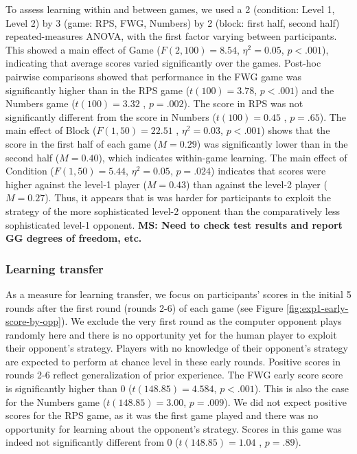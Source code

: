 \documentclass[
  english,
  man,floatsintext]{apa6}
\begin{document}
To assess learning within and between games, we used a 2 (condition: Level 1, Level 2) by 3 (game: RPS, FWG, Numbers) by 2 (block: first half, second half) repeated-measures ANOVA, with the first factor varying between participants. This showed a main effect of Game (\(F(2,100) = 8.54\), \(\eta^{2} = 0.05\), \(p < .001\)), indicating that average scores varied significantly over the games. Post-hoc pairwise comparisons showed that performance in the FWG game was significantly higher than in the RPS game (\(t(100) =3.78\), \(p < .001\)) and the Numbers game (\(t(100) = 3.32\) , \(p = .002\)). The score in RPS was not significantly different from the score in Numbers (\(t(100) = 0.45\) , \(p = .65\)). The main effect of Block (\(F(1,50) = 22.51\) , \(\eta^{2} = 0.03\), \(p < .001\)) shows that the score in the first half of each game (\(M = 0.29\)) was significantly lower than in the second half (\(M = 0.40\)), which indicates within-game learning. The main effect of Condition (\(F(1,50) = 5.44\), \(\eta^{2} = 0.05\), \(p = .024\)) indicates that scores were higher against the level-1 player (\(M = 0.43\)) than against the level-2 player (\(M = 0.27\)). Thus, it appears that is was harder for participants to exploit the strategy of the more sophisticated level-2 opponent than the comparatively less sophisticated level-1 opponent. \textbf{MS: Need to check test results and report GG degrees of freedom, etc.}

\hypertarget{learning-transfer}{%
\subsubsection{Learning transfer}\label{learning-transfer}}

As a measure for learning transfer, we focus on participants' scores in the initial 5 rounds after the first round (rounds 2-6) of each game (see Figure \ref{fig:exp1-early-score-by-opp}). We exclude the very first round as the computer opponent plays randomly here and there is no opportunity yet for the human player to exploit their opponent's strategy. Players with no knowledge of their opponent's strategy are expected to perform at chance level in these early rounds. Positive scores in rounds 2-6 reflect generalization of prior experience. The FWG early score score is significantly higher than 0 (\(t(148.85) = 4.584\), \(p < .001\)). This is also the case for the Numbers game (\(t(148.85) = 3.00\), \(p = .009\)). We did not expect positive scores for the RPS game, as it was the first game played and there was no opportunity for learning about the opponent's strategy. Scores in this game was indeed not significantly different from 0 (\(t(148.85) = 1.04\) , \(p = .89\)).
\end{document}
